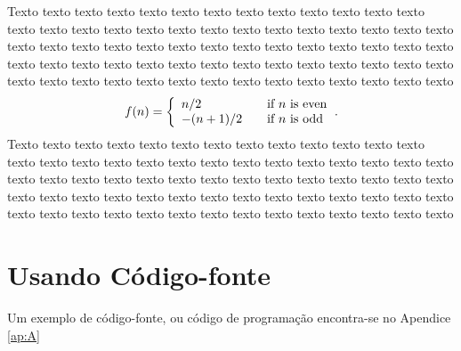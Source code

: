 Texto texto texto texto texto texto texto texto texto texto texto texto texto texto texto texto texto texto texto texto texto texto texto texto texto texto texto texto texto texto texto texto texto texto texto texto texto texto texto texto texto texto texto texto texto texto texto texto texto texto texto texto texto texto texto texto texto texto texto texto texto texto texto texto texto texto texto texto texto
	\begin{equation}
	\label{eq:sistema}
		\begin{aligned}
			f(n) = \left\{ 
			\begin{array}{l l}
			n/2 & \quad \text{if $n$ is even}\\
			-(n+1)/2 & \quad \text{if $n$ is odd}
			\end{array} \right.
		\end{aligned}.
	\end{equation}
Texto texto texto texto texto texto texto texto texto texto texto texto texto texto texto texto texto texto texto texto texto texto texto texto texto texto texto texto texto texto texto texto texto texto texto texto texto texto texto texto texto texto texto texto texto texto texto texto texto texto texto texto texto texto texto texto texto texto texto texto texto texto texto texto texto texto texto texto texto



\section{Usando Código-fonte}

Um exemplo de código-fonte, ou código de programação encontra-se no Apendice \ref{ap:A}

